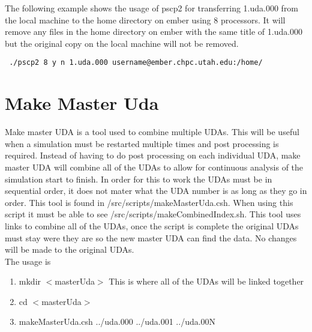 The following example shows the usage of pscp2 for transferring 1.uda.000 from the local machine to the home directory on ember using 8 processors. It will remove any files in the home directory on ember with the same title of 1.uda.000 but the original copy on the local machine will not be removed.

\begin{Verbatim}
 ./pscp2 8 y n 1.uda.000 username@ember.chpc.utah.edu:/home/
\end{Verbatim}

\section{Make Master Uda}
Make master UDA is a tool used to combine multiple UDAs. This will be useful when a simulation must be restarted multiple times and post processing is required. Instead of having to do post processing on each individual UDA, make master UDA will combine all of the UDAs to allow for continuous analysis of the simulation start to finish. In order for this to work the UDAs must be in sequential order, it does not mater what the UDA number is as long as they go in order.  This tool is found in /src/scripts/makeMasterUda.csh. When using this script it must be able to see /src/scripts/makeCombinedIndex.sh. This tool uses links to combine all of the UDAs, once the script is complete the original UDAs must stay were they are so the new master UDA can find the data. No changes will be made to the original UDAs.
\\
The usage is 
\begin{enumerate}
  \item mkdir $<$masterUda$>$ This is where all of the UDAs will be linked together
  \item cd $<$masterUda$>$
  \item makeMasterUda.csh ../uda.000 ../uda.001 ../uda.00N
\end{enumerate}

